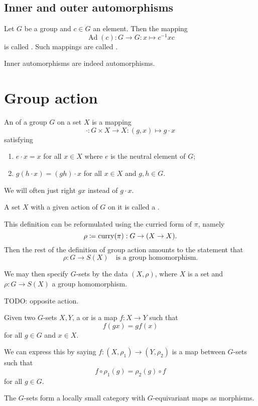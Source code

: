 \subsection{Inner and outer automorphisms}
\begin{definition}
Let $G$ be a group and $c\in G$ an element. Then the mapping
\[ \operatorname{Ad}(c): G\to G: x\mapsto c^{-1}xc \]
is called . Such mappings are called .
\end{definition}
Inner automorphisms are indeed automorphisms.


\section{Group action}
\begin{definition}
An  of a group $G$ on a set $X$ is a mapping
\[ \cdot: G\times X \to X: (g,x) \mapsto g\cdot x \]
satisfying
\begin{enumerate}
\item $e\cdot x = x$ for all $x\in X$ where $e$ is the neutral element of $G$;
\item $g(h\cdot x) = (gh)\cdot x$ for all $x\in X$ and $g,h\in G$.
\end{enumerate}
We will often just right $gx$ instead of $g\cdot x$.

A set $X$ with a given action of $G$ on it is called a .
\end{definition}
This definition can be reformulated using the curried form of $\pi$, namely
\[ \rho \coloneqq \operatorname{curry}(\pi): G \to (X\to X). \]
Then the rest of the definition of group action amounts to the statement that 
\[ \rho: G \to S(X) \quad \text{is a group homomorphism.} \]

We may then specify $G$-sets by the data $(X,\rho)$, where $X$ is a set and $\rho: G \to S(X)$ a group homomorphism.

TODO: opposite action.

\begin{definition}
Given two $G$-sets $X,Y$, a  or  is a map $f:X \to Y$ such that
\[ f(gx) = gf(x) \]
for all $g\in G$ and $x\in X$.
\end{definition}
We can express this by saying $f: (X,\rho_1) \to (Y,\rho_2)$ is a map between $G$-sets such that
\[ f\circ \rho_1(g) = \rho_2(g)\circ f \]
for all $g\in G$.

\begin{lemma}
The $G$-sets form a locally small category with $G$-equivariant maps as morphisms.
\end{lemma}


